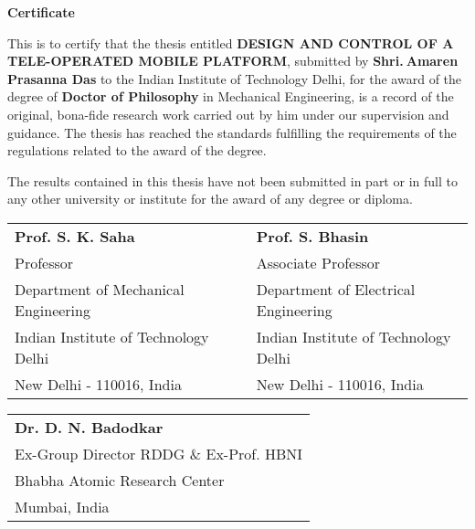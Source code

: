 \doublespacing
\thispagestyle{empty}

\begin{center}
\textbf{\Large{Certificate}}
\end{center}

This is to certify that the thesis entitled \textbf{DESIGN AND CONTROL OF A TELE-OPERATED MOBILE PLATFORM}, submitted by   \textbf{Shri.$~$Amaren Prasanna Das} to the Indian Institute of Technology Delhi, for the award of the degree of \textbf{Doctor of Philosophy} in Mechanical Engineering, is a record of the original, bona-fide research work carried out by him under our supervision and guidance. The thesis has reached the standards fulfilling the requirements of the regulations related to the award of the degree.

The results contained in this thesis have not been submitted in part or in full to any other university or institute for the award of any degree or diploma.
\bigskip
\bigskip
\bigskip
\bigskip
\bigskip

\begin{tabular}{l l l}
\textbf{Prof. S. K. Saha} &  & \textbf{Prof. S. Bhasin}\\
Professor & &Associate Professor\\
Department of Mechanical Engineering &  & Department of Electrical Engineering\\
Indian Institute of Technology Delhi &  & Indian Institute of Technology Delhi\\
New Delhi - 110016, India & \quad \quad \quad & New Delhi - 110016, India
\end{tabular}
\bigskip
\bigskip
\bigskip
\bigskip
\bigskip

\begin{tabular}{l}
\textbf{Dr. D. N. Badodkar}\\
Ex-Group Director RDDG \& Ex-Prof. HBNI  \\  
Bhabha Atomic Research Center\\
Mumbai, India\\
\end{tabular}











\pagebreak 
\thispagestyle{empty}
\mbox{}
\restoregeometry